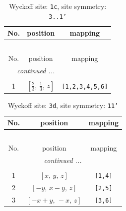 \documentclass[fleqn,8pt]{jsarticle}
\begin{document}
\begin{longtable}{ccc}
\caption{Wyckoff site: {\tt 1c}, site symmetry: {\tt 3..1'}}
 \\
 \hline \hline
No. & position & mapping \\ \hline \endfirsthead

\multicolumn{2}{l}{\tablename\ \thetable{}} \\
 \hline \hline
No. & position & mapping \\ \hline \endhead

 \hline \hline
\multicolumn{2}{r}{\footnotesize\it continued ...} \\ \endfoot

 \hline \hline
\multicolumn{2}{r}{} \\ \endlastfoot

1 & $\left[ \frac{2}{3},\, \frac{1}{3},\, z \right]$ & {\tt [1,2,3,4,5,6]} \\
\end{longtable}
\renewcommand{\arraystretch}{1.2}
\begin{longtable}{ccc}
\caption{Wyckoff site: {\tt 3d}, site symmetry: {\tt 11'}}
 \\
 \hline \hline
No. & position & mapping \\ \hline \endfirsthead

\multicolumn{2}{l}{\tablename\ \thetable{}} \\
 \hline \hline
No. & position & mapping \\ \hline \endhead

 \hline \hline
\multicolumn{2}{r}{\footnotesize\it continued ...} \\ \endfoot

 \hline \hline
\multicolumn{2}{r}{} \\ \endlastfoot

1 & $\left[ x,\, y,\, z \right]$ & {\tt [1,4]} \\ \hline
2 & $\left[ - y,\, x - y,\, z \right]$ & {\tt [2,5]} \\ \hline
3 & $\left[ - x + y,\, - x,\, z \right]$ & {\tt [3,6]} \\
\end{longtable}
\end{document}
